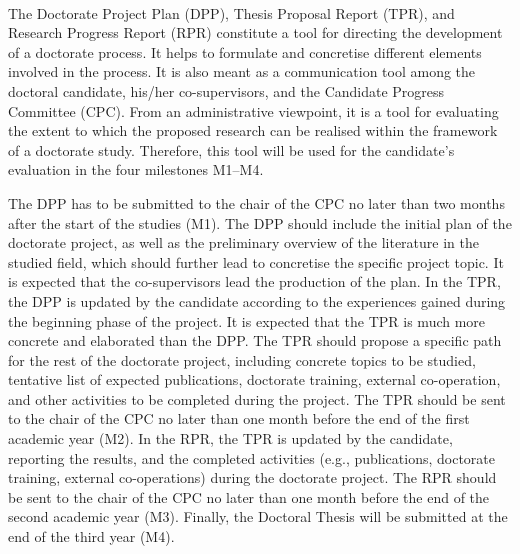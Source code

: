 \documentclass[12pt]{article}
\begin{document}
\noindent{}\\[5mm]


The Doctorate Project Plan (DPP), Thesis Proposal Report (TPR), and Research Progress Report (RPR) constitute a tool for directing the development of a  doctorate process. It helps to formulate and concretise different elements involved in the process. It is also meant as a communication tool among the doctoral candidate, his/her co-supervisors, and the Candidate Progress Committee (CPC).  From an administrative viewpoint, it is a tool for evaluating the extent to which the proposed research can be realised within the framework of a doctorate study. Therefore, this tool will be used for the candidate's evaluation in the four milestones M1--M4.

The DPP has to be submitted to the chair of the CPC no later than two months after the start of the studies (M1). The DPP should include the initial plan of the doctorate project, as well as the preliminary overview of the literature in the studied field, which should further lead to concretise the specific project topic. It is expected that the co-supervisors lead the production of the plan.
In the TPR, the DPP is updated by the candidate according to the experiences gained during the beginning phase of the project. It is expected that the TPR is much more concrete and elaborated than the DPP. The TPR should propose a specific path for the rest of the doctorate project, including concrete topics to be studied, tentative list of expected publications, doctorate training, external co-operation, and other activities to be completed during the project. The TPR should be sent to the chair of the CPC no later than one month before the end of the first academic year (M2). In the RPR, the TPR is updated by the candidate, reporting the results, and the completed activities (e.g., publications, doctorate training, external co-operations) during the doctorate project. The RPR should be sent to the chair of the CPC no later than one month before the end of the second academic year (M3). Finally, the Doctoral Thesis will be submitted at the end of the third year (M4).
\end{document}
